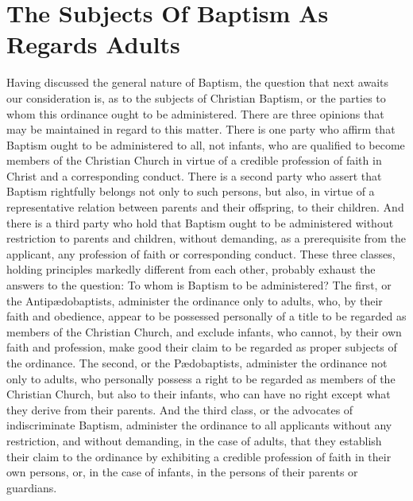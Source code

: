 \documentclass[english,]{book}
\begin{document}
\hypertarget{the-subjects-of-baptism-as-regards-adults}{%
\section{The Subjects Of Baptism As Regards Adults}\label{the-subjects-of-baptism-as-regards-adults}}

Having discussed the general nature of Baptism, the question that next awaits our consideration is, as to the subjects of Christian Baptism, or the parties to whom this ordinance ought to be administered. There are three opinions that may be maintained in regard to this matter. There is one party who affirm that Baptism ought to be administered to all, not infants, who are qualified to become members of the Christian Church in virtue of a credible profession of faith in Christ and a corresponding conduct. There is a second party who assert that Baptism rightfully belongs not only to such persons, but also, in virtue of a representative relation between parents and their offspring, to their children. And there is a third party who hold that Baptism ought to be administered without restriction to parents and children, without demanding, as a prerequisite from the applicant, any profession of faith or corresponding conduct. These three classes, holding principles markedly different from each other, probably exhaust the answers to the question: To whom is Baptism to be administered? The first, or the Antipædobaptists, administer the ordinance only to adults, who, by their faith and obedience, appear to be possessed personally of a title to be regarded as members of the Christian Church, and exclude infants, who cannot, by their own faith and profession, make good their claim to be regarded as proper subjects of the ordinance. The second, or the Pædobaptists, administer the ordinance not only to adults, who personally possess a right to be regarded as members of the Christian Church, but also to their infants, who can have no right except what they derive from their parents. And the third class, or the advocates of indiscriminate Baptism, administer the ordinance to all applicants without any restriction, and without demanding, in the case of adults, that they establish their claim to the ordinance by exhibiting a credible profession of faith in their own persons, or, in the case of infants, in the persons of their parents or guardians.
\end{document}
